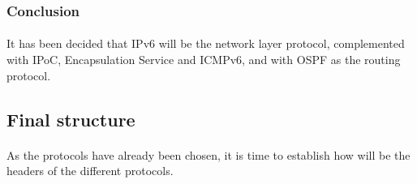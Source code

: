 \subsubsection{Conclusion}
\paragraph{}It has been decided that IPv6 will be the network layer protocol, complemented with IPoC, Encapsulation Service and ICMPv6, and with OSPF as the routing protocol.

\subsection{Final structure}
\paragraph{}As the protocols have already been chosen, it is time to establish how will be the headers of the different protocols.
